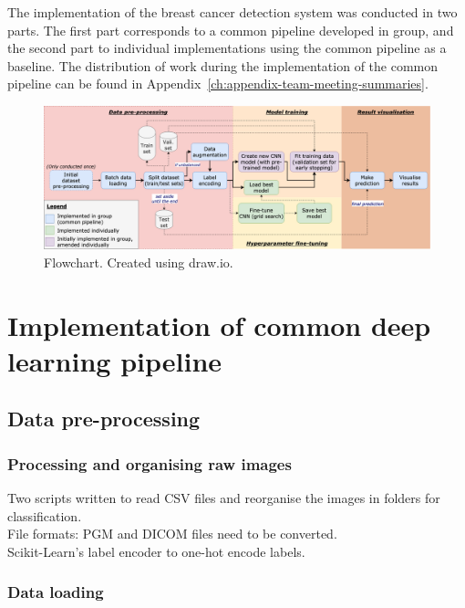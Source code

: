 The implementation of the breast cancer detection system was conducted in two parts. The first part corresponds to a common pipeline developed in group, and the second part to individual implementations using the common pipeline as a baseline. The distribution of work during the implementation of the common pipeline can be found in Appendix~\ref{ch:appendix-team-meeting-summaries}.

\begin{figure}[ht]
\centerline{\includegraphics[width=1.25\textwidth]{Dissertation/figures/implementation/detailed flowchart.png}}
\caption{\label{fig:implementation-detailed-flowchart}Flowchart. Created using draw.io.}
\end{figure}



\section{Implementation of common deep learning pipeline}


\subsection{Data pre-processing}

\subsubsection{Processing and organising raw images}

Two scripts written to read CSV files and reorganise the images in folders for classification.\\

File formats: PGM and DICOM files need to be converted.\\

Scikit-Learn's label encoder to one-hot encode labels.


\subsubsection{Data loading}

